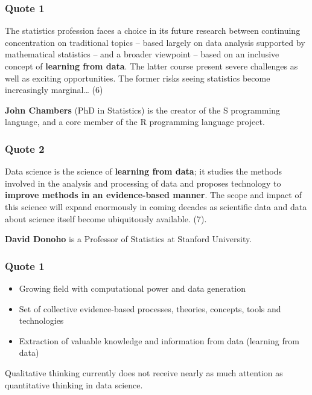 \documentclass[
  letterpaper,
  DIV=11,
  numbers=noendperiod]{scrreprt}
\providecommand{\tightlist}{%
  \setlength{\itemsep}{0pt}\setlength{\parskip}{0pt}}\usepackage{longtable,booktabs,array}
\begin{document}
\hypertarget{quote-1}{%
\subsubsection{\texorpdfstring{Quote 1
{💬}}{Quote 1 💬}}\label{quote-1}}

The statistics profession faces a choice in its future research between
continuing concentration on traditional topics -- based largely on data
analysis supported by mathematical statistics -- and a broader viewpoint
-- based on an inclusive concept of \textbf{learning from data}. The
latter course present severe challenges as well as exciting
opportunities. The former risks seeing statistics become increasingly
marginal\ldots{} (6)

\textbf{John Chambers} (PhD in Statistics) is the creator of the S
programming language, and a core member of the R programming language
project.

\hypertarget{quote-2}{%
\subsubsection{\texorpdfstring{Quote 2
{💬}}{Quote 2 💬}}\label{quote-2}}

Data science is the science of \textbf{learning from data}; it studies
the methods involved in the analysis and processing of data and proposes
technology to \textbf{improve methods in an evidence-based manner}. The
scope and impact of this science will expand enormously in coming
decades as scientific data and data about science itself become
ubiquitously available. (7).

\textbf{David Donoho} is a Professor of Statistics at Stanford
University.

\hypertarget{quote-1-1}{%
\subsubsection{Quote 1}\label{quote-1-1}}

\begin{itemize}
\tightlist
\item
  Growing field with computational power and data generation
\item
  Set of collective evidence-based processes, theories, concepts, tools
  and technologies
\item
  Extraction of valuable knowledge and information from data (learning
  from data)
\end{itemize}

Qualitative thinking currently does not receive nearly as much attention
as quantitative thinking in data science.
\end{document}
